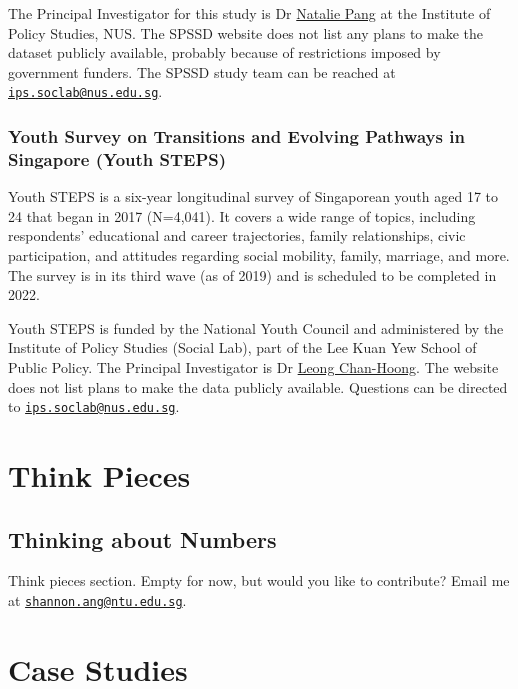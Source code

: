 \documentclass[openany]{book}
\begin{document}
The Principal Investigator for this study is Dr
\href{https://lkyspp.nus.edu.sg/our-people/faculty/natalie-pang}{Natalie
Pang} at the Institute of Policy Studies, NUS. The SPSSD website does
not list any plans to make the dataset publicly available, probably
because of restrictions imposed by government funders. The SPSSD study
team can be reached at
\href{mailto:ips.soclab@nus.edu.sg}{\nolinkurl{ips.soclab@nus.edu.sg}}.

\section{Youth Survey on Transitions and Evolving Pathways in Singapore
(Youth
STEPS)}\label{youth-survey-on-transitions-and-evolving-pathways-in-singapore-youth-steps}

Youth STEPS is a six-year longitudinal survey of Singaporean youth aged
17 to 24 that began in 2017 (N=4,041). It covers a wide range of topics,
including respondents' educational and career trajectories, family
relationships, civic participation, and attitudes regarding social
mobility, family, marriage, and more. The survey is in its third wave
(as of 2019) and is scheduled to be completed in 2022.

Youth STEPS is funded by the National Youth Council and administered by
the Institute of Policy Studies (Social Lab), part of the Lee Kuan Yew
School of Public Policy. The Principal Investigator is Dr
\href{http://lkyspp.splashinteractive.sg/ips/about-us/staff-directory/leong-chan-hoong}{Leong
Chan-Hoong}. The website does not list plans to make the data publicly
available. Questions can be directed to
\href{mailto:ips.soclab@nus.edu.sg}{\nolinkurl{ips.soclab@nus.edu.sg}}.

\part{Think Pieces}\label{part-think-pieces}

\chapter{Thinking about Numbers}\label{think}

Think pieces section. Empty for now, but would you like to contribute?
Email me at
\href{mailto:shannon.ang@ntu.edu.sg}{\nolinkurl{shannon.ang@ntu.edu.sg}}.

\part{Case Studies}\label{part-case-studies}
\end{document}
